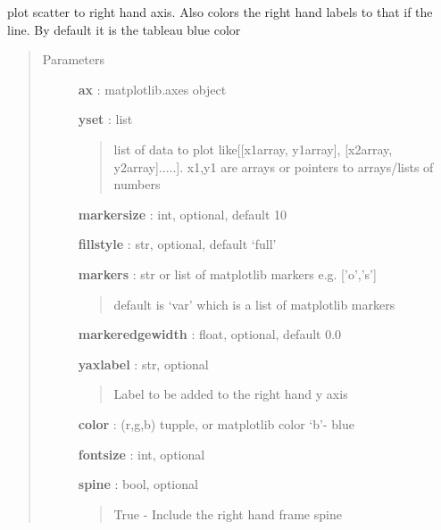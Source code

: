 \documentclass[letterpaper,10pt,english]{sphinxmanual}
\begin{document}

\begin{fulllineitems}
\label{pubplots:pubplots.plot.plot_sright2}
plot scatter to right hand axis. Also colors the right hand labels to that if the line. By
default it is the tableau blue color
\begin{quote}\begin{description}
\item[{Parameters}] \leavevmode
\textbf{ax} : matplotlib.axes object

\textbf{yset} : list
\begin{quote}

list of data to plot like{[}{[}x1array, y1array{]}, {[}x2array, y2array{]}.....{]}.
x1,y1 are arrays or pointers to arrays/lists of numbers
\end{quote}

\textbf{markersize} : int, optional, default 10

\textbf{fillstyle} : str, optional, default `full'

\textbf{markers} : str or list of matplotlib markers e.g. {[}'o','s'{]}
\begin{quote}

default is `var' which is a list of matplotlib markers
\end{quote}

\textbf{markeredgewidth} : float, optional, default 0.0

\textbf{yaxlabel} : str, optional
\begin{quote}

Label to be added to the right hand y axis
\end{quote}

\textbf{color} : (r,g,b) tupple, or matplotlib color `b'- blue

\textbf{fontsize} : int, optional

\textbf{spine} : bool, optional
\begin{quote}

True - Include the right hand frame spine
\end{quote}


\end{description}
\end{quote}
\end{fulllineitems}
\end{document}

